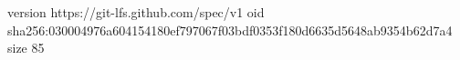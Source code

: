 version https://git-lfs.github.com/spec/v1
oid sha256:030004976a604154180ef797067f03bdf0353f180d6635d5648ab9354b62d7a4
size 85
